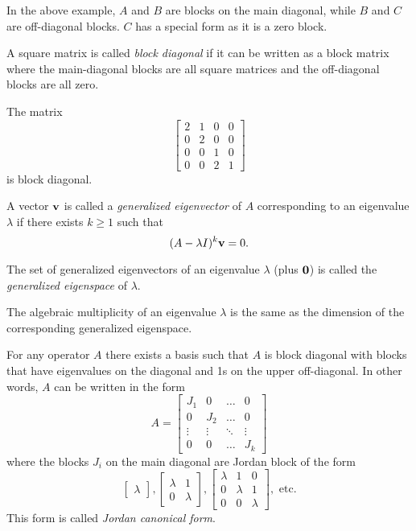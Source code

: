 \documentclass{article}
\begin{document}
In the above example, $A$ and $B$ are blocks on the main diagonal, while $B$ and $C$ are off-diagonal blocks. $C$ has a special form as it is a zero block.

\begin{definition}
A square matrix is called \emph{block diagonal} if it can be written as a block matrix where the main-diagonal blocks are all square matrices and the off-diagonal blocks are all zero.
\end{definition}

\begin{example}
The matrix
$$ \begin{bmatrix} 2 & 1 & 0 & 0  \\ 0 & 2 &0 & 0 \\ 0 & 0 & 1 & 0 \\ 0 & 0 & 2 & 1 \end{bmatrix} $$
is block diagonal.
\end{example}

\begin{definition}
A vector ${\mathbf{v}}$ is called a \emph{generalized eigenvector} of $A$ corresponding to an eigenvalue $\lambda$ if there exists $k \geq 1$ such that 
$$ (A - \lambda I)^k {\mathbf{v}} = 0.$$
\end{definition}

The set of generalized eigenvectors of an eigenvalue $\lambda$ (plus ${\mathbf{0}}$) is called the \emph{generalized eigenspace} of $\lambda$.

\begin{proposition}
The algebraic multiplicity of an eigenvalue $\lambda$ is the same as the dimension of the corresponding generalized eigenspace.
\end{proposition}

\begin{theorem}
For any operator $A$ there exists a basis such that $A$ is block diagonal with blocks that have eigenvalues on the diagonal and 1s on the upper off-diagonal. In other words, $A$ can be written in the form
$$ A = \begin{bmatrix} J_1 & 0 & \ldots & 0\\ 0 & J_2 & \ldots & 0 \\ \vdots & \vdots & \ddots & \vdots \\ 0 & 0 & \ldots & J_k \end{bmatrix} $$
where the blocks $J_i$ on the main diagonal are Jordan block of the form 
$$\begin{bmatrix} \lambda  \end{bmatrix}, \begin{bmatrix} \lambda & 1  \\ 0 &\lambda \end{bmatrix}, \begin{bmatrix} \lambda & 1 & 0 \\ 0 &\lambda & 1 \\ 0 & 0 & \lambda \end{bmatrix}, \text{ etc.}$$
This form is called \emph{Jordan canonical form}.
\end{theorem}
\end{document}
